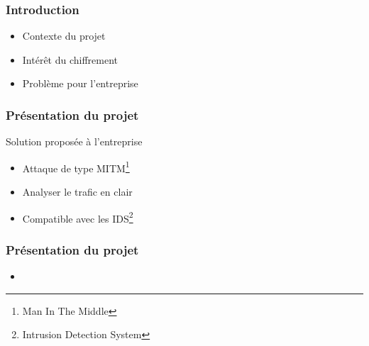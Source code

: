 \begin{frame}
\frametitle{Introduction}
\begin{itemize}
\item Contexte du projet
\item Intérêt du chiffrement
\item Problème pour l'entreprise
\end{itemize}
\end{frame}


\begin{frame}
\frametitle{Présentation du projet}
Solution proposée à l'entreprise
\begin{itemize}
\item Attaque de type MITM\footnote[frame]{Man In The Middle}
\item Analyser le trafic en clair
\item Compatible avec les IDS\footnote[frame]{Intrusion Detection System}
\end{itemize}
\end{frame}

\begin{frame}
\frametitle{Présentation du projet}
\begin{itemize}
\item 
\end{itemize}
\end{frame}